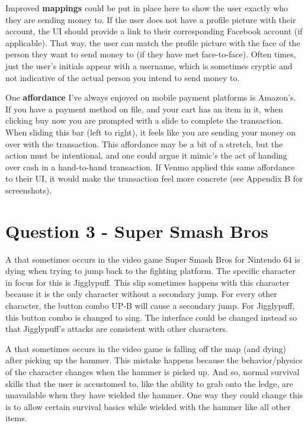 Improved \textbf{mappings} could be put in place here to show the user exactly who they are sending money to. If the user does not have a profile picture with their account, the UI should provide a link to their corresponding Facebook account (if applicable). That way, the user can match the profile picture with the face of the person they want to send money to (if they have met face-to-face). Often times, just the user's initials appear with a username, which is sometimes cryptic and not indicative of the actual person you intend to send money to.

One \textbf{affordance} I've always enjoyed on mobile payment platforms is Amazon's. If you have a payment method on file, and your cart has an item in it, when clicking buy now you are prompted with a slide to complete the transaction. When sliding this bar (left to right), it feels like you are sending your money on over with the transaction. This affordance may be a bit of a stretch, but the action must be intentional, and one could argue it mimic's the act of handing over cash in a hand-to-hand transaction. If Venmo applied this same affordance to their UI, it would make the transaction feel more concrete (see Appendix B for screenshots).

\section{Question 3 - Super Smash Bros}

A  that sometimes occurs in the video game Super Smash Bros for Nintendo 64 is dying when trying to jump back to the fighting platform. The specific character in focus for this is Jigglypuff. This slip sometimes happens with this character because it is the only character without a secondary jump. For every other character, the button combo UP-B will cause a secondary jump. For Jigglypuff, this button combo is changed to sing. The interface could be changed instead so that Jigglypuff's attacks are consistent with other characters.

A  that sometimes occurs in the video game is falling off the map (and dying) after picking up the hammer. This mistake happens because the behavior/physics of the character changes when the hammer is picked up. And so, normal survival skills that the user is accustomed to, like the ability to grab onto the ledge, are unavailable when they have wielded the hammer. One way they could change this is to allow certain survival basics while wielded with the hammer like all other items.

